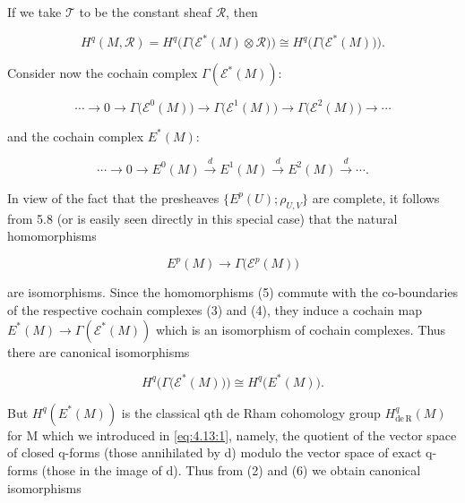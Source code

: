 If we take  $ \mathcal{T} $ to be the constant sheaf  $ \mathcal{R} $, then

\begin{equation}
\tag{2}\label{eq:5.30:2}
H^{q}(M,\mathcal{R})=H^{q}\big(\Gamma\big(\mathcal{E}^{*}(M)\otimes\mathcal{R}\big)\big)\cong H^{q}\big(\Gamma\big(\mathcal{E}^{*}(M)\big)\big).
\end{equation}

Consider now the cochain complex  $ \Gamma(\mathcal{E}^{*}(M)) $:

\begin{equation}
\tag{3}\label{eq:5.30:3}
\cdots\to0\to\Gamma\bigl(\mathcal{E}^{0}(M)\bigr)\to\Gamma\bigl(\mathcal{E}^{1}(M)\bigr)\to\Gamma\bigl(\mathcal{E}^{2}(M)\bigr)\to\cdots
\end{equation}

and the cochain complex  $ E^{*}(M) $:

\begin{equation}
\tag{4}\label{eq:5.30:4}
\cdots\to0\to E^{0}(M)\stackrel{d}{\longrightarrow}E^{1}(M)\stackrel{d}{\longrightarrow}E^{2}(M)\stackrel{d}{\longrightarrow}\cdots.
\end{equation}

In view of the fact that the presheaves  $ \{E^{p}(U);\rho_{U,V}\} $ are complete, it follows from 5.8 (or is easily seen directly in this special case) that the natural homomorphisms

\begin{equation}
\tag{5}\label{eq:5.30:5}
E^{p}(M)\to\Gamma\bigl(\mathcal{E}^{p}(M)\bigr)
\end{equation}

are isomorphisms. Since the homomorphisms (5) commute with the co-boundaries of the respective cochain complexes (3) and (4), they induce a cochain map  $ E^*(M) \to \Gamma(\mathcal{E}^*(M)) $ which is an isomorphism of cochain complexes. Thus there are canonical isomorphisms

\begin{equation}
\tag{6}\label{eq:5.30:6}
H^{q}\bigl(\Gamma\bigl(\mathcal{E}^{*}(M)\bigr)\bigr)\cong H^{q}\bigl(E^{*}(M)\bigr).
\end{equation}

But  $ H^{q}(E^{*}(M)) $ is the classical qth de Rham cohomology group  $ H_{\mathrm{de\,R}}^{q}(M) $ for M which we introduced in \eqref{eq:4.13:1}, namely, the quotient of the vector space of closed q-forms (those annihilated by d) modulo the vector space of exact q-forms (those in the image of d). Thus from (2) and (6) we obtain canonical isomorphisms

